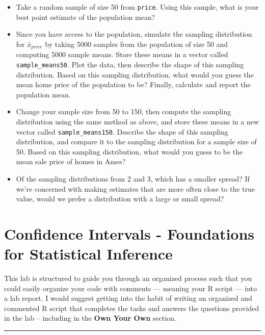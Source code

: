 \documentclass[]{book}
\theoremstyle{definition}
\theoremstyle{definition}
\theoremstyle{definition}
\theoremstyle{remark}
\begin{document}
\begin{itemize}
\item
  Take a random sample of size 50 from \texttt{price}. Using this
  sample, what is your best point estimate of the population mean?
\item
  Since you have access to the population, simulate the sampling
  distribution for \(\bar{x}_{price}\) by taking 5000 samples from the
  population of size 50 and computing 5000 sample means. Store these
  means in a vector called \texttt{sample\_means50}. Plot the data, then
  describe the shape of this sampling distribution. Based on this
  sampling distribution, what would you guess the mean home price of the
  population to be? Finally, calculate and report the population mean.
\item
  Change your sample size from 50 to 150, then compute the sampling
  distribution using the same method as above, and store these means in
  a new vector called \texttt{sample\_means150}. Describe the shape of
  this sampling distribution, and compare it to the sampling
  distribution for a sample size of 50. Based on this sampling
  distribution, what would you guess to be the mean sale price of homes
  in Ames?
\item
  Of the sampling distributions from 2 and 3, which has a smaller
  spread? If we're concerned with making estimates that are more often
  close to the true value, would we prefer a distribution with a large
  or small spread?
\end{itemize}

\hypertarget{confidence-intervals---foundations-for-statistical-inference}{%
\chapter{Confidence Intervals - Foundations for Statistical
Inference}\label{confidence-intervals---foundations-for-statistical-inference}}

This lab is structured to guide you through an organized process such
that you could easily organize your code with comments --- meaning your
R script --- into a lab report. I would suggest getting into the habit
of writing an organized and commented R script that completes the tasks
and answers the questions provided in the lab -- including in the
\textbf{Own Your Own} section.

\begin{center}\rule{0.5\linewidth}{\linethickness}\end{center}
\end{document}
